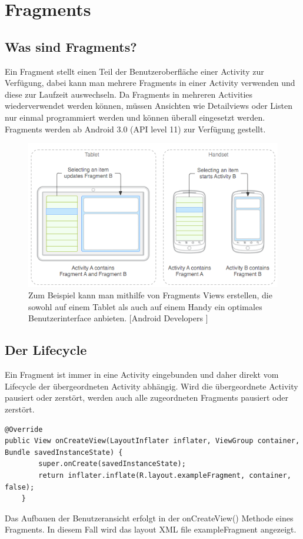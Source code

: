 \documentclass[FIPLY_base.tex]{subfiles}
\begin{document}
\section{Fragments}
\subsection{Was sind Fragments?}
Ein Fragment stellt einen Teil der Benutzeroberfläche einer Activity zur Verfügung, dabei kann man mehrere Fragments in einer Activity verwenden und diese zur Laufzeit auswechseln.
Da Fragments in mehreren Activities wiederverwendet werden können, müssen Ansichten wie Detailviews oder Listen nur einmal programmiert werden und können überall eingesetzt werden.
Fragments werden ab Android 3.0 (API level 11) zur Verfügung gestellt. 

\begin{figure}[h]
\includegraphics[scale=0.60]{img/fragments_modules}
\caption{Zum Beispiel kann man mithilfe von Fragments Views erstellen, die sowohl auf einem Tablet als auch auf einem Handy ein optimales Benutzerinterface anbieten. 
[Android Developers \cite{adFragmentsGuide}]}
\end{figure}

\newpage
\subsection{Der Lifecycle}
Ein Fragment ist immer in eine Activity eingebunden und daher direkt vom Lifecycle der übergeordneten Activity abhängig.
Wird die übergeordnete Activity pausiert oder zerstört, werden auch alle zugeordneten Fragments pausiert oder zerstört. %
\ \\
\begin{lstlisting}
@Override
public View onCreateView(LayoutInflater inflater, ViewGroup container, Bundle savedInstanceState) {
        super.onCreate(savedInstanceState);
        return inflater.inflate(R.layout.exampleFragment, container, false);
    }
\end{lstlisting}
Das Aufbauen der Benutzeransicht erfolgt in der onCreateView() Methode eines Fragments. In diesem Fall wird das layout XML file exampleFragment angezeigt.
\end{document}
